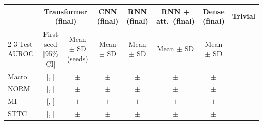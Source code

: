 \begin{tabular}{lccccccc}
\toprule
 & \multicolumn{2}{c}{Transformer (final)} & CNN (final) & RNN (final) & RNN + att.\ (final) & Dense (final) & Trivial \\
\cmidrule(lr){2-3}
Test AUROC & First seed [95\% CI] & Mean $\pm$ SD (seeds) & Mean $\pm$ SD & Mean $\pm$ SD & Mean $\pm$ SD & Mean $\pm$ SD &  \\
\midrule
Macro & \transformerFinalFirstTestMacroAuroc{} [\transformerFinalFirstTestMacroAurocLo{}, \transformerFinalFirstTestMacroAurocHi{}] & \transformerFinalTestMacroAurocMean{} $\pm$ \transformerFinalTestMacroAurocSd{} & \cnnFinalTestMacroAurocMean{} $\pm$ \cnnFinalTestMacroAurocSd{} & \rnnFinalTestMacroAurocMean{} $\pm$ \rnnFinalTestMacroAurocSd{} & \rnnAttnfinalTestMacroAurocMean{} $\pm$ \rnnAttnfinalTestMacroAurocSd{} & \denseFinalTestMacroAurocMean{} $\pm$ \denseFinalTestMacroAurocSd{} & \trivialTestMacroAuroc{} \\
\midrule
NORM & \transformerFinalFirstTestAurocNORM{} [\transformerFinalFirstTestAurocNORMLo{}, \transformerFinalFirstTestAurocNORMHi{}] & \transformerFinalTestAurocNORMMean{} $\pm$ \transformerFinalTestAurocNORMSd{} & \cnnFinalTestAurocNORMMean{} $\pm$ \cnnFinalTestAurocNORMSd{} & \rnnFinalTestAurocNORMMean{} $\pm$ \rnnFinalTestAurocNORMSd{} & \rnnAttnfinalTestAurocNORMMean{} $\pm$ \rnnAttnfinalTestAurocNORMSd{} & \denseFinalTestAurocNORMMean{} $\pm$ \denseFinalTestAurocNORMSd{} & \trivialTestAurocNORM{} \\
MI & \transformerFinalFirstTestAurocMI{} [\transformerFinalFirstTestAurocMILo{}, \transformerFinalFirstTestAurocMIHi{}] & \transformerFinalTestAurocMIMean{} $\pm$ \transformerFinalTestAurocMISd{} & \cnnFinalTestAurocMIMean{} $\pm$ \cnnFinalTestAurocMISd{} & \rnnFinalTestAurocMIMean{} $\pm$ \rnnFinalTestAurocMISd{} & \rnnAttnfinalTestAurocMIMean{} $\pm$ \rnnAttnfinalTestAurocMISd{} & \denseFinalTestAurocMIMean{} $\pm$ \denseFinalTestAurocMISd{} & \trivialTestAurocMI{} \\
STTC & \transformerFinalFirstTestAurocSTTC{} [\transformerFinalFirstTestAurocSTTCLo{}, \transformerFinalFirstTestAurocSTTCHi{}] & \transformerFinalTestAurocSTTCMean{} $\pm$ \transformerFinalTestAurocSTTCSd{} & \cnnFinalTestAurocSTTCMean{} $\pm$ \cnnFinalTestAurocSTTCSd{} & \rnnFinalTestAurocSTTCMean{} $\pm$ \rnnFinalTestAurocSTTCSd{} & \rnnAttnfinalTestAurocSTTCMean{} $\pm$ \rnnAttnfinalTestAurocSTTCSd{} & \denseFinalTestAurocSTTCMean{} $\pm$ \denseFinalTestAurocSTTCSd{} & \trivialTestAurocSTTC{} \\

\end{tabular}

